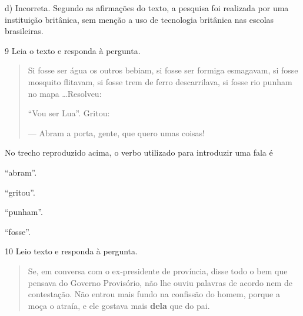 \begin{escolha}
\begin{escolha}
\begin{escolha}
{d) Incorreta. Segundo as afirmações do texto, a pesquisa foi realizada
por uma instituição britânica, sem menção a uso de tecnologia britânica
nas escolas brasileiras.}

\num{9} Leia o texto e responda à pergunta.

\begin{quote}
Si fosse ser água os outros bebiam, si fosse ser formiga esmagavam, si
fosse mosquito flitavam, si fosse trem de ferro descarrilava, si fosse
rio punham no mapa \ldots Resolveu:

``Vou ser Lua''. Gritou:

--- Abram a porta, gente, que quero umas coisas!
\end{quote}


No trecho reproduzido acima, o verbo utilizado para introduzir uma fala
é

\begin{escolha}
  \item ``abram''.

  \item ``gritou''.

  \item ``punham''.

  \item ``fosse''.
\end{escolha}


\num{10} Leio texto e responda à pergunta.

\begin{quote}
Se, em conversa com o ex-presidente de província, disse todo o bem que
pensava do Governo Provisório, não lhe ouviu palavras de acordo nem de
contestação. Não entrou mais fundo na confissão do homem, porque a moça
o atraía, e ele gostava mais \textbf{dela} que do pai.
\end{quote}


\end{escolha}
\end{escolha}
\end{escolha}
